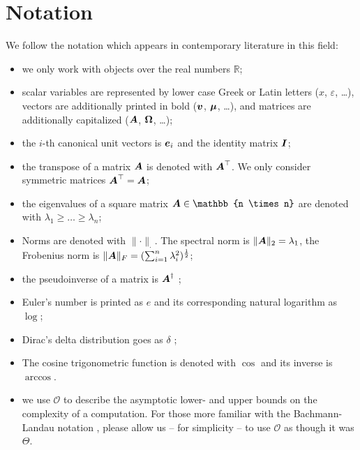 
\section{Notation}
\label{sec:1-introduction-notation}

We follow the notation which appears in contemporary literature in this field:

\begin{itemize}
    \item we only work with objects over the real numbers $\mathbb{R}$;
    \item scalar variables are represented by lower case Greek or Latin letters ($x$, $\varepsilon$, \dots),
          vectors are additionally printed in bold ($\boldsymbol{v}$, $\boldsymbol{\mu}$, \dots),
          and matrices are additionally capitalized ($\boldsymbol{A}$, $\boldsymbol{\Omega}$, \dots);
    \item the $i$-th canonical unit vectors is $\boldsymbol{e}_i$ and the identity matrix $\boldsymbol{I}$;
    \item the transpose of a matrix $\boldsymbol{A}$ is denoted with $\boldsymbol{A}^{\top}$.
          We only consider symmetric matrices $\boldsymbol{A}^{\top} = \boldsymbol{A}$;
    \item the eigenvalues of a square matrix $\mtx{A} \in \mathbb{n \times n}$
          are denoted with $\lambda_1 \geq \dots \geq \lambda_n$;
    \item Norms are denoted with $\lVert \cdot \rVert _{\cdot}$. The spectral norm is
          $\lVert \boldsymbol{A} \rVert _2 = \lambda_1$, the Frobenius norm
          is $\lVert \boldsymbol{A} \rVert _F = (\sum_{i=1}^{n} \lambda_i^2)^{\frac{1}{2}}$;
    \item the pseudoinverse of a matrix is $\boldsymbol{A}^{\dagger}$ \cite{penrose1955pseudo};
    \item Euler's number is printed as $e$ and its corresponding natural logarithm as $\log$;
    \item Dirac's delta distribution goes as $\delta$ \cite[Chapter~15]{dirac1947quantum};
    \item The cosine trigonometric function is denoted with $\cos$ and its inverse is $\arccos$.
    \item we use $\mathcal{O}$ to describe the asymptotic lower- and upper bounds
          on the complexity of a computation. For those more familiar with the
          Bachmann-Landau notation \cite[Section~3.2]{cormen2009algorithms},
          please allow us -- for simplicity -- to use $\mathcal{O}$ as though it was $\Theta$.
\end{itemize}
